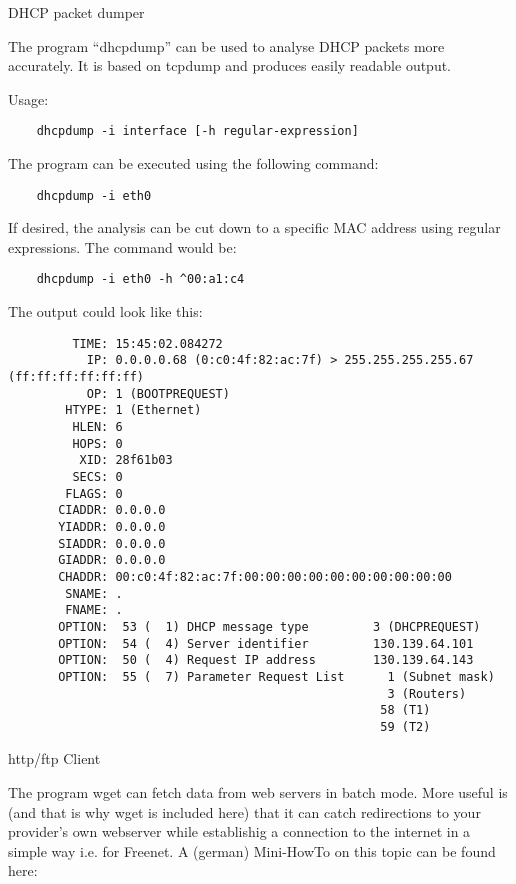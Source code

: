 \begin{description}
 DHCP packet dumper

    The program ``dhcpdump'' can be used to analyse DHCP packets more
    accurately. It is based on tcpdump and produces easily readable output.

    Usage:

\begin{verbatim}
    dhcpdump -i interface [-h regular-expression]
\end{verbatim}

    The program can be executed using the following command:

\begin{verbatim}
    dhcpdump -i eth0
\end{verbatim}

    If desired, the analysis can be cut down to a specific MAC address using
    regular expressions. The command would be:

\begin{verbatim}
    dhcpdump -i eth0 -h ^00:a1:c4
\end{verbatim}

    The output could look like this:

\begin{example}
\begin{verbatim}
         TIME: 15:45:02.084272
           IP: 0.0.0.0.68 (0:c0:4f:82:ac:7f) > 255.255.255.255.67 (ff:ff:ff:ff:ff:ff)
           OP: 1 (BOOTPREQUEST)
        HTYPE: 1 (Ethernet)
         HLEN: 6
         HOPS: 0
          XID: 28f61b03
         SECS: 0
        FLAGS: 0
       CIADDR: 0.0.0.0
       YIADDR: 0.0.0.0
       SIADDR: 0.0.0.0
       GIADDR: 0.0.0.0
       CHADDR: 00:c0:4f:82:ac:7f:00:00:00:00:00:00:00:00:00:00
        SNAME: .
        FNAME: .
       OPTION:  53 (  1) DHCP message type         3 (DHCPREQUEST)
       OPTION:  54 (  4) Server identifier         130.139.64.101
       OPTION:  50 (  4) Request IP address        130.139.64.143
       OPTION:  55 (  7) Parameter Request List      1 (Subnet mask)
                                                     3 (Routers)
                                                    58 (T1)
                                                    59 (T2)
\end{verbatim}
\end{example}
    
 http/ftp Client

    The program wget can fetch data from web servers in batch mode.
    More useful is (and that is why wget is included here) that it can
    catch redirections to your provider's own webserver while
    establishig a connection to the internet in a simple way i.e.
    for Freenet. A (german) Mini-HowTo on this topic can be found here:\\


\end{description}

